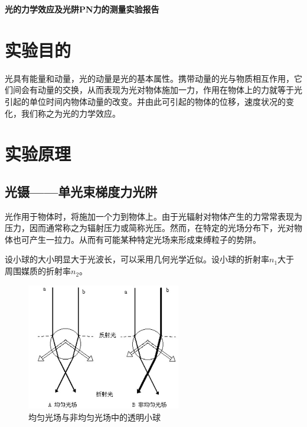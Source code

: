 \documentclass[a4paper,UTF8]{ctexart}
\begin{document}
\begin{center}
    \textbf{\Large 光的力学效应及光阱PN力的测量实验报告}
    \par {}
\end{center}

\section{实验目的}

光具有能量和动量，光的动量是光的基本属性。携带动量的光与物质相互作用，它们间会有动量的交换，从而表现为光对物体施加一力，作用在物体上的力就等于光引起的单位时间内物体动量的改变。并由此可引起的物体的位移，速度状况的变化，我们称之为光的力学效应。


\section{实验原理}

\subsection{光镊——单光束梯度力光阱}

光作用于物体时，将施加一个力到物体上。由于光辐射对物体产生的力常常表现为压力，因而通常称之为辐射压力或简称光压。然而，在特定的光场分布下，光对物体也可产生一拉力。从而有可能某种特定光场来形成束缚粒子的势阱。

设小球的大小明显大于光波长，可以采用几何光学近似。设小球的折射率$n_1$大于周围媒质的折射率$n_2$。

\begin{figure}[H]
    \centering
    \begin{minipage}[b]{0.9\textwidth}
        \centering
        \includegraphics[width=0.6\textwidth]{./fig1.jpg}
        \caption{均匀光场与非均匀光场中的透明小球}
    \end{minipage}
\end{figure}
\end{document}
